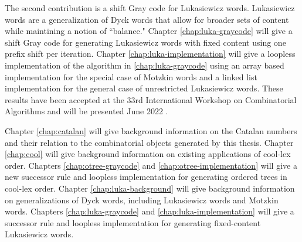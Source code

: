 The second contribution is a shift Gray code for Lukasiewicz words.  Lukasiewicz words are a generalization of Dyck words that allow for broader sets of content while maintining a notion of ``balance." Chapter \ref{chap:luka-graycode} will give a shift Gray code for generating Lukasiewicz words with fixed content using one prefix shift per iteration.  Chapter \ref{chap:luka-implementation} will give a loopless implementation of the algorithm in \ref{chap:luka-graycode} using an array based implementation for the special case of Motzkin words and a linked list implementation for the general case of unrestricted Lukasiewicz words.  These results have been accepted at the 33rd International Workshop on Combinatorial Algorithms and will be presented June 2022 \cite{lapey2022shift}.

Chapter \ref{chap:catalan} will give background information on the Catalan numbers and their relation to the combinatorial objects generated by this thesis.  Chapter \ref{chap:cool} will give background information on existing applications of cool-lex order.  Chapters \ref{chap:otree-graycode} and \ref{chap:otree-implementation} will give a new successor rule and loopless implementation for generating ordered trees in cool-lex order.  Chapter \ref{chap:luka-background} will give background information on generalizations of Dyck words, including Lukasiewicz words and Motzkin words. Chapters \ref{chap:luka-graycode} and \ref{chap:luka-implementation} will give a successor rule and loopless implementation for generating fixed-content Lukasiewicz words.
